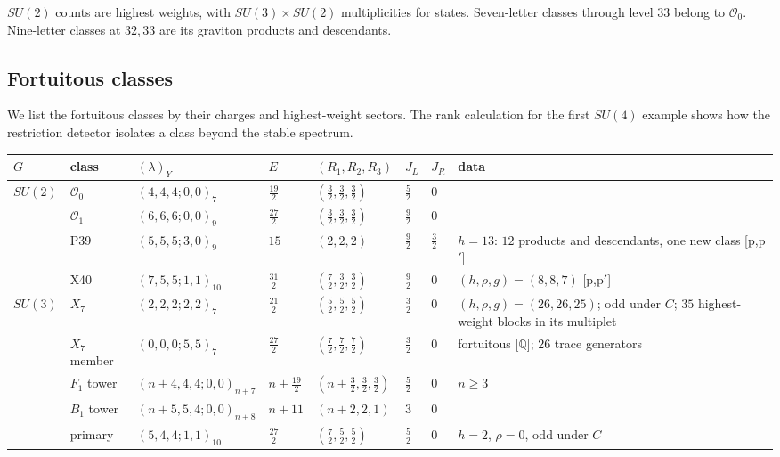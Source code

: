 \documentclass[11pt]{article}
\numberwithin{equation}{section}
\numberwithin{figure}{section}
\numberwithin{table}{section}
\begin{document}
$SU(2)$ counts are highest weights, with $SU(3)\times SU(2)$ multiplicities for states. Seven-letter classes through level $33$ belong to $\mathcal O_0$. Nine-letter classes at $32,33$ are its graviton products and descendants.

\subsection{Fortuitous classes}\label{sec-E-SU-classes}

We list the fortuitous classes by their charges and highest-weight sectors. The rank calculation for the first $SU(4)$ example shows how the restriction detector isolates a class beyond the stable spectrum.

{\small\renewcommand{\arraystretch}{1.25}\setlength{\tabcolsep}{4pt}
\begin{xltabular}{\linewidth}{@{}lllllll>{\raggedright\arraybackslash}X@{}}
\toprule
$G$ & class & $(\lambda)_Y$ & $E$ & $(R_1,R_2,R_3)$ & $J_L$ & $J_R$ & data\\
\midrule\endhead
$SU(2)$ & $\mathcal O_0$ & $(4,4,4;0,0)_7$ & $\tfrac{19}2$ & $(\tfrac32,\tfrac32,\tfrac32)$ & $\tfrac52$ & $0$ & \cite[Section 3.1]{ChangLinWords,KKLP}\\
 & $\mathcal O_1$ & $(6,6,6;0,0)_9$ & $\tfrac{27}2$ & $(\tfrac32,\tfrac32,\tfrac32)$ & $\tfrac92$ & $0$ & \cite{microstates}\\
 & P39 & $(5,5,5;3,0)_9$ & $15$ & $(2,2,2)$ & $\tfrac92$ & $\tfrac32$ & $h=13$: $12$ products and descendants, one new class [p,p$\prime$]\\
 & X40 & $(7,5,5;1,1)_{10}$ & $\tfrac{31}2$ & $(\tfrac72,\tfrac32,\tfrac32)$ & $\tfrac92$ & $0$ & $(h,\rho,g)=(8,8,7)$ [p,p$\prime$]\\
$SU(3)$ & $X_7$ & $(2,2,2;2,2)_7$ & $\tfrac{21}2$ & $(\tfrac52,\tfrac52,\tfrac52)$ & $\tfrac32$ & $0$ & $(h,\rho,g)=(26,26,25)$; odd under $C$; $35$ highest-weight blocks in its multiplet\\
 & $X_7$ member & $(0,0,0;5,5)_7$ & $\tfrac{27}2$ & $(\tfrac72,\tfrac72,\tfrac72)$ & $\tfrac32$ & $0$ & fortuitous [$\mathbb Q$]; $26$ trace generators\\
 & $F_1$ tower & $(n+4,4,4;0,0)_{n+7}$ & $n+\tfrac{19}2$ & $(n+\tfrac32,\tfrac32,\tfrac32)$ & $\tfrac52$ & $0$ & $n\ge3$ \cite{BraneFused,KLLS}\\
 & $B_1$ tower & $(n+5,5,4;0,0)_{n+8}$ & $n+11$ & $(n+2,2,1)$ & $3$ & $0$ & \cite{BraneFused,KLLS}\\
 & primary & $(5,4,4;1,1)_{10}$ & $\tfrac{27}2$ & $(\tfrac72,\tfrac52,\tfrac52)$ & $\tfrac52$ & $0$ & $h=2$, $\rho=0$, odd under $C$\\

\end{xltabular}}
\end{document}
